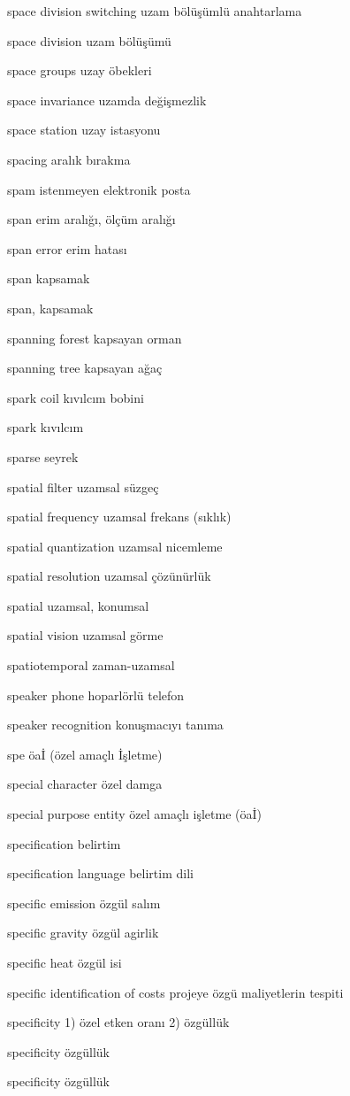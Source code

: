 \documentclass[12pt,fleqn]{article}\usepackage{../../common}
\begin{document}
space division switching uzam bölüşümlü anahtarlama

space division uzam bölüşümü

space groups uzay öbekleri

space invariance uzamda değişmezlik

space station uzay istasyonu

spacing aralık bırakma

spam istenmeyen elektronik posta

span erim aralığı, ölçüm aralığı

span error erim hatası

span kapsamak

span, kapsamak

spanning forest kapsayan orman

spanning tree kapsayan ağaç

spark coil kıvılcım bobini

spark kıvılcım

sparse seyrek

spatial filter uzamsal süzgeç

spatial frequency uzamsal frekans (sıklık)

spatial quantization uzamsal nicemleme

spatial resolution uzamsal çözünürlük

spatial uzamsal, konumsal

spatial vision uzamsal görme

spatiotemporal zaman-uzamsal

speaker phone hoparlörlü telefon

speaker recognition konuşmacıyı tanıma

spe öaİ (özel amaçlı İşletme)

special character özel damga

special purpose entity özel amaçlı işletme (öaİ)

specification belirtim

specification language belirtim dili

specific emission özgül salım

specific gravity özgül agirlik

specific heat özgül isi

specific identification of costs projeye özgü maliyetlerin tespiti

specificity 1) özel etken oranı 2) özgüllük

specificity özgüllük

specificity özgüllük
\end{document}

